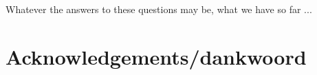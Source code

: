 \documentclass[12pt]{article}
\let\stdsection\section
\renewcommand\section{\newpage\stdsection}
\begin{document}
Whatever the answers to these questions may be, what we have so far ...

\section{Acknowledgements/dankwoord}


{}

\end{document}
